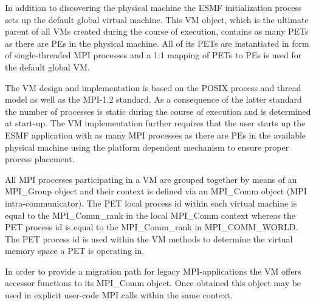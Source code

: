 In addition to discovering the physical machine the ESMF initialization process sets up the default global virtual machine. This VM object, which is the ultimate parent of all VMs created during the course of execution, contains as many PETs as there are PEs in the physical machine. All of its PETs are instantiated in form of single-threaded MPI processes and a 1:1 mapping of PETs to PEs is used for the default global VM.

The VM design and implementation is based on the POSIX process and thread model as well as the MPI-1.2 standard. As a consequence of the latter standard the number of processes is static during the course of execution and is determined at start-up. The VM implementation further requires that the user starts up the ESMF application with as many MPI processes as there are PEs in the available physical machine using the platform dependent mechanism to ensure proper process placement. 

All MPI processes participating in a VM are grouped together by means of an MPI\_Group object and their context is defined via an MPI\_Comm object (MPI intra-communicator). The PET local process id within each virtual machine is equal to the MPI\_Comm\_rank in the local MPI\_Comm context whereas the PET process id is equal to the MPI\_Comm\_rank in MPI\_COMM\_WORLD. The PET process id is used within the VM methods to determine the virtual memory space a PET is operating in. 

In order to provide a migration path for legacy MPI-applications the VM offers accessor functions to its MPI\_Comm object. Once obtained this object may be used in explicit user-code MPI calls within the same context.


